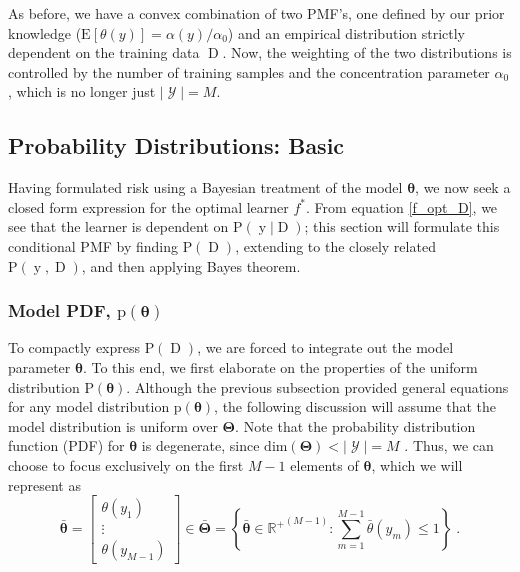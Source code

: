 \documentclass[12pt]{report}
\DeclareMathOperator{\yrm}{\mathrm{y}}
\DeclareMathOperator{\Drm}{\mathrm{D}}
\DeclareMathOperator{\Ycal}{\mathcal{Y}}
\begin{document}
As before, we have a convex combination of two PMF's, one defined by our prior knowledge ($\text{E}[\theta(y)] = \alpha(y)/\alpha_0$) and an empirical distribution strictly dependent on the training data $\Drm$. Now, the weighting of the two distributions is controlled by the number of training samples and the concentration parameter $\alpha_0$, which is no longer just $|\Ycal|=M$.








\subsection{Probability Distributions: Basic}

Having formulated risk using a Bayesian treatment of the model $\bm{\theta}$, we now seek a closed form expression for the optimal learner $f^*$. From equation \eqref{f_opt_D}, we see that the learner is dependent on $\text{P}(\yrm | \Drm)$; this section will formulate this conditional PMF by finding $\text{P}(\Drm)$, extending to the closely related $\text{P}(\yrm,\Drm)$, and then applying Bayes theorem.


\subsubsection{Model PDF, $\text{p}(\bm{\theta})$}

To compactly express $\text{P}(\Drm)$, we are forced to integrate out the model parameter $\bm{\theta}$. To this end, we first elaborate on the properties of the uniform distribution $\text{P}(\bm{\theta})$. Although the previous subsection provided general equations for any model distribution $\text{p}(\bm{\theta})$, the following discussion will assume that the model distribution is uniform over $\bm{\Theta}$. Note that the probability distribution function (PDF) for $\bm{\theta}$ is degenerate, since $\text{dim}(\bm{\Theta}) < |\Ycal| = M$ . Thus, we can choose to focus exclusively on the first $M-1$ elements of $\bm{\theta}$, which we will represent as
\begin{equation}
\bar{\bm{\theta}} = \begin{bmatrix} \theta(y_1) \\ \vdots \\ \theta(y_{M-1}) \end{bmatrix} \in \bar{\bm{\Theta}} = \left\{ \bar{\bm{\theta}} \in {\mathbb{R}^+}^{(M-1)}: \sum_{m=1}^{M-1} \bar{\theta}(y_m) \leq 1 \right\} \;.
\end{equation}
\end{document}
